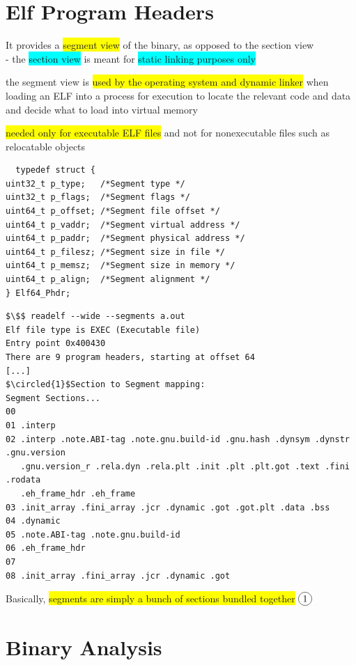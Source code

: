 \documentclass[]{project_plan}
\newcommand*\circled[1]{\tikz[baseline=(char.base)]{
            \node[shape=circle,draw,inner sep=2pt] (char) {#1};}}
\begin{document}
\section{Elf Program Headers}

It provides a \colorbox{yellow}{segment view} of the binary, as opposed to the section view\\
- the \colorbox{cyan}{section view} is meant for \colorbox{cyan}{static linking purposes only}

the segment view is \colorbox{yellow}{used by the operating system and dynamic linker} when
loading an ELF into a process for execution to locate the relevant code
and data and decide what to load into virtual memory

\colorbox{yellow}{needed only for executable ELF files} and not for nonexecutable files such
as relocatable objects

\begin{lstlisting}
  typedef struct {
uint32_t p_type;   /*Segment type */
uint32_t p_flags;  /*Segment flags */
uint64_t p_offset; /*Segment file offset */
uint64_t p_vaddr;  /*Segment virtual address */
uint64_t p_paddr;  /*Segment physical address */
uint64_t p_filesz; /*Segment size in file */
uint64_t p_memsz;  /*Segment size in memory */
uint64_t p_align;  /*Segment alignment */
} Elf64_Phdr;
\end{lstlisting}

\newpage

\begin{lstlisting}[mathescape]
  $\$$ readelf --wide --segments a.out
Elf file type is EXEC (Executable file)
Entry point 0x400430
There are 9 program headers, starting at offset 64
[...]
$\circled{1}$Section to Segment mapping:
Segment Sections...
00
01 .interp
02 .interp .note.ABI-tag .note.gnu.build-id .gnu.hash .dynsym .dynstr .gnu.version
   .gnu.version_r .rela.dyn .rela.plt .init .plt .plt.got .text .fini .rodata
   .eh_frame_hdr .eh_frame
03 .init_array .fini_array .jcr .dynamic .got .got.plt .data .bss
04 .dynamic
05 .note.ABI-tag .note.gnu.build-id
06 .eh_frame_hdr
07
08 .init_array .fini_array .jcr .dynamic .got
\end{lstlisting}

Basically, \colorbox{yellow}{segments are simply a bunch of sections bundled together} $\circled{1}$

\section{Binary Analysis}
\end{document}
